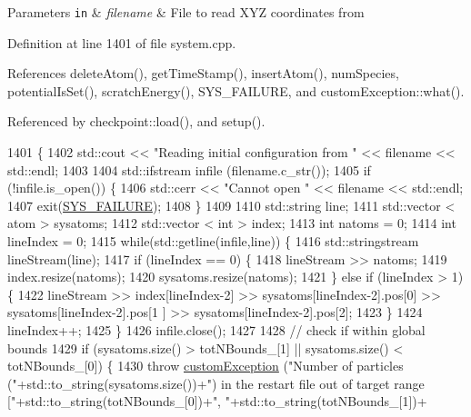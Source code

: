 \begin{DoxyParams}[1]{Parameters}
\mbox{\tt in}  & {\em filename} & File to read X\-Y\-Z coordinates from \\
\hline
\end{DoxyParams}


Definition at line 1401 of file system.\-cpp.



References delete\-Atom(), get\-Time\-Stamp(), insert\-Atom(), num\-Species, potential\-Is\-Set(), scratch\-Energy(), S\-Y\-S\-\_\-\-F\-A\-I\-L\-U\-R\-E, and custom\-Exception\-::what().



Referenced by checkpoint\-::load(), and setup().


\begin{DoxyCode}
1401                                               \{
1402     std::cout << \textcolor{stringliteral}{"Reading initial configuration from "} << filename << std::endl;
1403 
1404     std::ifstream infile (filename.c\_str());
1405     \textcolor{keywordflow}{if} (!infile.is\_open()) \{
1406         std::cerr << \textcolor{stringliteral}{"Cannot open "} << filename << std::endl;
1407         exit(\hyperlink{global_8h_a428dfe1ef0a6ff4b1fdebf275f6aff2e}{SYS\_FAILURE});
1408     \}
1409 
1410     std::string line;
1411     std::vector < atom > sysatoms;
1412     std::vector < int > index;
1413     \textcolor{keywordtype}{int} natoms = 0;
1414     \textcolor{keywordtype}{int} lineIndex = 0;
1415     \textcolor{keywordflow}{while}(std::getline(infile,line)) \{
1416         std::stringstream lineStream(line);
1417         \textcolor{keywordflow}{if} (lineIndex == 0) \{
1418             lineStream >> natoms;
1419             index.resize(natoms);
1420             sysatoms.resize(natoms);
1421         \} \textcolor{keywordflow}{else} \textcolor{keywordflow}{if} (lineIndex > 1) \{
1422             lineStream >> index[lineIndex-2] >> sysatoms[lineIndex-2].pos[0] >> sysatoms[lineIndex-2].pos[1
      ] >> sysatoms[lineIndex-2].pos[2];
1423         \}
1424         lineIndex++;
1425     \}
1426     infile.close();
1427 
1428     \textcolor{comment}{// check if within global bounds}
1429     \textcolor{keywordflow}{if} (sysatoms.size() > totNBounds\_[1] || sysatoms.size() < totNBounds\_[0]) \{
1430         \textcolor{keywordflow}{throw} \hyperlink{classcustom_exception}{customException} (\textcolor{stringliteral}{"Number of particles ("}+std::to\_string(sysatoms.size())+\textcolor{stringliteral}{") in
       the restart file out of target range ["}+std::to\_string(totNBounds\_[0])+\textcolor{stringliteral}{", "}+std::to\_string(totNBounds\_[1])+\textcolor{stringliteral}{
}
\end{DoxyCode}
